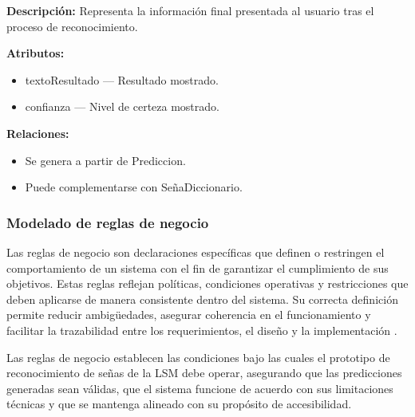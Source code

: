 	\textbf{Descripción:} Representa la información final presentada al usuario tras el proceso de reconocimiento.
	
	\textbf{Atributos:}
	\begin{itemize}
		\item textoResultado — Resultado mostrado.
		\item confianza — Nivel de certeza mostrado.
	\end{itemize}
	
	\textbf{Relaciones:}
	\begin{itemize}
		\item Se genera a partir de Prediccion.
		\item Puede complementarse con SeñaDiccionario.
	\end{itemize}
	
	\subsubsection{Modelado de reglas de negocio}
	
	Las reglas de negocio son declaraciones específicas que definen o restringen el comportamiento de un sistema con el fin de garantizar el cumplimiento de sus objetivos. Estas reglas reflejan políticas, condiciones operativas y restricciones que deben aplicarse de manera consistente dentro del sistema. Su correcta definición permite reducir ambigüedades, asegurar coherencia en el funcionamiento y facilitar la trazabilidad entre los requerimientos, el diseño y la implementación \cite{halle2008,lam2015}.
	
	Las reglas de negocio establecen las condiciones bajo las cuales el prototipo de reconocimiento de señas de la LSM debe operar, asegurando que las predicciones generadas sean válidas, que el sistema funcione de acuerdo con sus limitaciones técnicas y que se mantenga alineado con su propósito de accesibilidad.
	
	
	\small
	\renewcommand{\arraystretch}{1.15}
	
